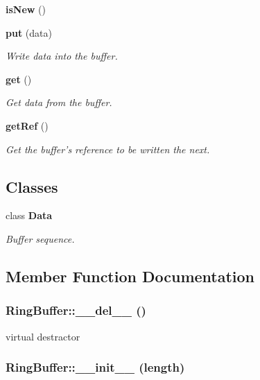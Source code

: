 \begin{CompactItemize}
{\bf is\-New} ()
\item 
{\bf put} (data)
\begin{CompactList}\small\item\em Write data into the buffer. \item\end{CompactList}\item 
{\bf get} ()
\begin{CompactList}\small\item\em Get data from the buffer. \item\end{CompactList}\item 
{\bf get\-Ref} ()
\begin{CompactList}\small\item\em Get the buffer's reference to be written the next. \item\end{CompactList}\end{CompactItemize}
\subsection*{Classes}
\begin{CompactItemize}
\item 
class {\bf Data}
\begin{CompactList}\small\item\em Buffer sequence. \item\end{CompactList}\end{CompactItemize}


\subsection{Member Function Documentation}
\subsubsection{\setlength{\rightskip}{0pt plus 5cm}Ring\-Buffer::\_\-\_\-del\_\-\_\- ()}\label{classRingBuffer_RingBuffera1}


virtual destractor 

\subsubsection{\setlength{\rightskip}{0pt plus 5cm}Ring\-Buffer::\_\-\_\-init\_\-\_\- (length)}\label{classRingBuffer_RingBuffera0}


